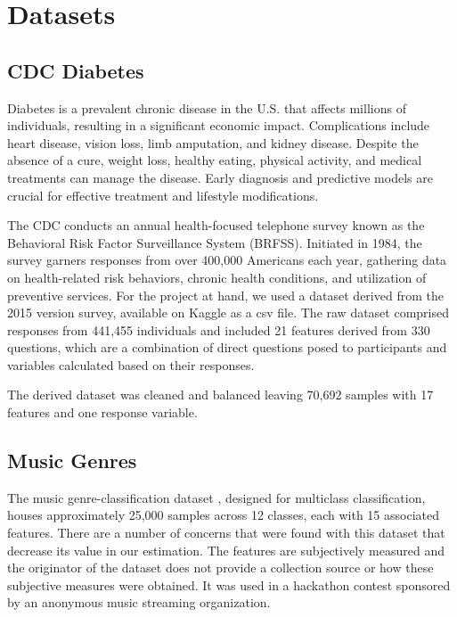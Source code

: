 \documentclass[journal]{IEEEtran}
\begin{document}
	\section{Datasets}
	\label{sec:dataset}
	
	\subsection{CDC Diabetes}
	\cite{cdc2022}
	Diabetes is a prevalent chronic disease in the U.S. that affects millions of individuals, resulting in a significant economic impact. Complications include heart disease, vision loss, limb amputation, and kidney disease. Despite the absence of a cure, weight loss, healthy eating, physical activity, and medical treatments can manage the disease. Early diagnosis and predictive models are crucial for effective treatment and lifestyle modifications.
	
	The CDC conducts an annual health-focused telephone survey known as the Behavioral Risk Factor Surveillance System (BRFSS). Initiated in 1984, the survey garners responses from over 400,000 Americans each year, gathering data on health-related risk behaviors, chronic health conditions, and utilization of preventive services. For the project at hand, we used a dataset derived from the 2015 version survey, available on Kaggle as a csv file. The raw dataset comprised responses from 441,455 individuals and included 21 features derived from 330 questions, which are a combination of direct questions posed to participants and variables calculated based on their responses.

	The derived dataset was cleaned and balanced leaving 70,692 samples with 17 features and one response variable. 
	
	\subsection{Music Genres}
	The music genre-classification dataset \cite{Music_Genre_Classification}, designed for multiclass classification, 
	houses approximately 25,000 samples across 12 classes, each with 15 associated features.
	There are a number of concerns that were found with this dataset that decrease its value in our estimation.
	The features are subjectively measured and the originator of the dataset does not provide a 
	collection source or how these subjective measures were obtained.
	It was used in a hackathon contest sponsored by an anonymous music streaming organization.
	
\end{document}
